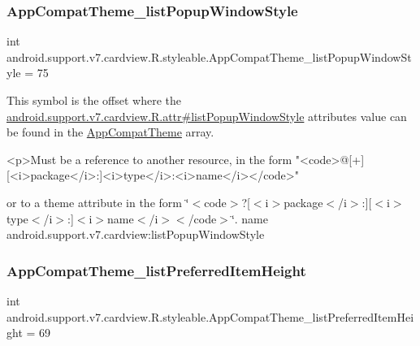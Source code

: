 \subsubsection{\texorpdfstring{App\+Compat\+Theme\+\_\+list\+Popup\+Window\+Style}{AppCompatTheme\_listPopupWindowStyle}}
{\footnotesize\ttfamily int android.\+support.\+v7.\+cardview.\+R.\+styleable.\+App\+Compat\+Theme\+\_\+list\+Popup\+Window\+Style = 75\hspace{0.3cm}{\ttfamily [static]}}

This symbol is the offset where the \hyperlink{classandroid_1_1support_1_1v7_1_1cardview_1_1R_1_1attr_a1e3167b62207f7538133ab484f1b1f5d}{android.\+support.\+v7.\+cardview.\+R.\+attr\#list\+Popup\+Window\+Style} attribute\textquotesingle{}s value can be found in the \hyperlink{classandroid_1_1support_1_1v7_1_1cardview_1_1R_1_1styleable_a52e6f69f954ecc2622d72c0b4d298938}{App\+Compat\+Theme} array.

\begin{DoxyVerb}      <p>Must be a reference to another resource, in the form "<code>@[+][<i>package</i>:]<i>type</i>:<i>name</i></code>"
\end{DoxyVerb}
 or to a theme attribute in the form \char`\"{}$<$code$>$?\mbox{[}$<$i$>$package$<$/i$>$\+:\mbox{]}\mbox{[}$<$i$>$type$<$/i$>$\+:\mbox{]}$<$i$>$name$<$/i$>$$<$/code$>$\char`\"{}.  name android.\+support.\+v7.\+cardview\+:list\+Popup\+Window\+Style \mbox{\label{classandroid_1_1support_1_1v7_1_1cardview_1_1R_1_1styleable_a619c201403d7a5bd57d8bba7b672369e}} 
\subsubsection{\texorpdfstring{App\+Compat\+Theme\+\_\+list\+Preferred\+Item\+Height}{AppCompatTheme\_listPreferredItemHeight}}
{\footnotesize\ttfamily int android.\+support.\+v7.\+cardview.\+R.\+styleable.\+App\+Compat\+Theme\+\_\+list\+Preferred\+Item\+Height = 69\hspace{0.3cm}{\ttfamily [static]}}

